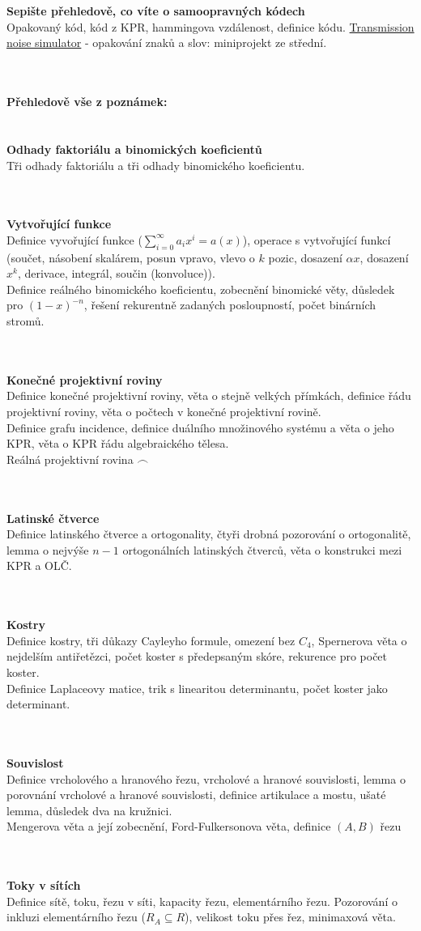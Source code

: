 \documentclass[a4paper]{article}
\newcommand{\fr}{$\frown$}
\newcommand{\hlava}[1]{\text{} \\ \text{} \\ \text{} \hspace{-0.27cm} \textbf{#1} \\}
\newcommand{\str}[1]{\hspace{0.05cm} \fbox{s. #1} }
\begin{document}
\hlava{Sepište přehledově, co víte o samoopravných kódech}
Opakovaný kód, kód z KPR, hammingova vzdálenost, definice kódu. \href{http://vilix.xyz/s/noise\_simulator/}{Transmission noise simulator} - opakování znaků a slov: miniprojekt ze střední.

\pagebreak
\hlava{Přehledově vše z poznámek:}

\hlava{Odhady faktoriálu a binomických koeficientů}
Tři odhady faktoriálu a tři odhady binomického koeficientu. \str{0}

\hlava{Vytvořující funkce}
Definice vyvořující funkce ($\sum_{i=0}^\infty a_ix^i = a(x)$), operace s vytvořující funkcí (součet, násobení skalárem, posun vpravo, vlevo o $k$ pozic, dosazení $\alpha x$, dosazení $x^k$, derivace, integrál, součin (konvoluce)). \\
Definice reálného binomického koeficientu, zobecnění binomické věty, důsledek pro $(1-x)^{-n}$, řešení rekurentně zadaných posloupností, počet binárních stromů. \str{3}

\hlava{Konečné projektivní roviny}
Definice konečné projektivní roviny, věta o stejně velkých přímkách, definice řádu projektivní roviny, věta o počtech v konečné projektivní rovině. \\
Definice grafu incidence, definice duálního množinového systému a věta o jeho KPR, věta o KPR řádu algebraického tělesa. \\
Reálná projektivní rovina \fr \str{6}

\hlava{Latinské čtverce}
Definice latinského čtverce a ortogonality, čtyři drobná pozorování o ortogonalitě, lemma o nejvýše $n-1$ ortogonálních latinských čtverců, věta o konstrukci mezi KPR a OLČ. \str{10}

\hlava{Kostry}
Definice kostry, tři důkazy Cayleyho formule, omezení bez $C_4$, Spernerova věta o nejdelším antiřetězci, počet koster s předepsaným skóre, rekurence pro počet koster. \\
Definice Laplaceovy matice, trik s linearitou determinantu, počet koster jako determinant. \str{13}

\hlava{Souvislost}
Definice vrcholového a hranového řezu, vrcholové a hranové souvislosti, lemma o porovnání vrcholové a hranové souvislosti, definice artikulace a mostu, ušaté lemma, důsledek dva na kružnici. \\
Mengerova věta a její zobecnění, Ford-Fulkersonova věta, definice $(A,B)$ řezu \str{17}

\hlava{Toky v sítích}
Definice sítě, toku, řezu v síti, kapacity řezu, elementárního řezu. Pozorování o inkluzi elementárního řezu ($R_A \subseteq R$), velikost toku přes řez, minimaxová věta.
\str{20}
\end{document}
